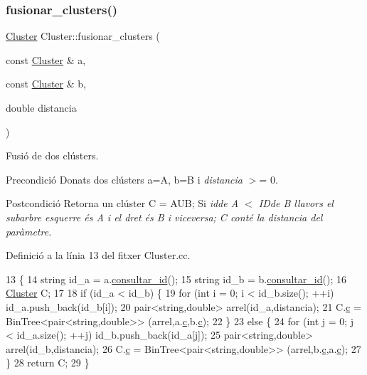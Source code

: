 \subsubsection{\texorpdfstring{fusionar\+\_\+clusters()}{fusionar\_clusters()}}
{\footnotesize\ttfamily \hyperlink{class_cluster}{Cluster} Cluster\+::fusionar\+\_\+clusters (\begin{DoxyParamCaption}\item[{const \hyperlink{class_cluster}{Cluster} \&}]{a,  }\item[{const \hyperlink{class_cluster}{Cluster} \&}]{b,  }\item[{double}]{distancia }\end{DoxyParamCaption})\hspace{0.3cm}{\ttfamily [static]}}



Fusió de dos clústers. 

\begin{DoxyPrecond}{Precondició}
Donats dos clústers a=A, b=B i {\itshape distancia} $>$= 0. 
\end{DoxyPrecond}
\begin{DoxyPostcond}{Postcondició}
Retorna un clúster C = A\+UB; Si {\itshape id{\itshape  de A $<$ {\itshape ID{\itshape  de B llavors el subarbre esquerre és A i el dret és B i viceversa; C conté la distancia del paràmetre. }}}}
\end{DoxyPostcond}


Definició a la línia 13 del fitxer Cluster.\+cc.


\begin{DoxyCode}
13                                                                                        \{
14     \textcolor{keywordtype}{string} id\_a = a.\hyperlink{class_cluster_a040da4a393c7fcb8ac7edbe5b82679cf}{consultar\_id}();
15     \textcolor{keywordtype}{string} id\_b = b.\hyperlink{class_cluster_a040da4a393c7fcb8ac7edbe5b82679cf}{consultar\_id}();
16     \hyperlink{class_cluster}{Cluster} C;
17     
18     \textcolor{keywordflow}{if} (id\_a < id\_b) \{
19         \textcolor{keywordflow}{for} (\textcolor{keywordtype}{int} i = 0; i < id\_b.size(); ++i) id\_a.push\_back(id\_b[i]);
20         pair<string,double> arrel(id\_a,distancia);
21         C.\hyperlink{class_cluster_a1a623435b5ec16328059c9300fa0dfaa}{c} = BinTree<pair<string,double>> (arrel,a.\hyperlink{class_cluster_a1a623435b5ec16328059c9300fa0dfaa}{c},b.\hyperlink{class_cluster_a1a623435b5ec16328059c9300fa0dfaa}{c});
22     \}
23     \textcolor{keywordflow}{else} \{
24         \textcolor{keywordflow}{for} (\textcolor{keywordtype}{int} j = 0; j < id\_a.size(); ++j) id\_b.push\_back(id\_a[j]);
25         pair<string,double> arrel(id\_b,distancia);
26         C.\hyperlink{class_cluster_a1a623435b5ec16328059c9300fa0dfaa}{c} = BinTree<pair<string,double>> (arrel,b.\hyperlink{class_cluster_a1a623435b5ec16328059c9300fa0dfaa}{c},a.\hyperlink{class_cluster_a1a623435b5ec16328059c9300fa0dfaa}{c});
27     \}
28     \textcolor{keywordflow}{return} C;
29 \}
\end{DoxyCode}
\mbox{\label{class_cluster_a040da4a393c7fcb8ac7edbe5b82679cf}} 

